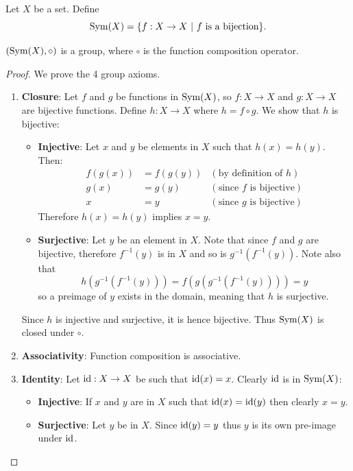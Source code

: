 \begin{definition}
    Let $X$ be a set. Define
    \[
        \mathrm{Sym}(X) = \{f: X \to X \ | \ f \text{ is a bijection}\}.
    \]
\end{definition}
\begin{proposition}
    $(\mathrm{Sym}(X), \circ)$ is a group, where $\circ$ is the function composition operator.
\end{proposition}
\begin{proof}
    We prove the 4 group axioms.
    \begin{enumerate}
        \item \textbf{Closure}: Let $f$ and $g$ be functions in $\mathrm{Sym}(X)$, so $f: X\to X$ and $g:X \to X$ are bijective functions. Define $h:X \to X$ where $h = f\circ g$. We show that $h$ is bijective:
        \begin{itemize}
            \item \textbf{Injective}: Let $x$ and $y$ be elements in $X$ such that $h(x) = h(y)$. Then:
            \begin{align*}
                f(g(x)) &= f(g(y)) & (\text{by definition of } h)\\
                g(x) &= g(y) & (\text{since } f \text{ is bijective})\\
                x &= y & (\text{since } g \text{ is bijective})
            \end{align*}
            Therefore $h(x) = h(y)$ implies $x = y$.
            \item \textbf{Surjective}: Let $y$ be an element in $X$. Note that since $f$ and $g$ are bijective, therefore $f^{-1}(y)$ is in $X$ and so is $g^{-1}(f^{-1}(y))$. Note also that
            \[
                h(g^{-1}(f^{-1}(y))) = f(g(g^{-1}(f^{-1}(y)))) = y
            \]
            so a preimage of $y$ exists in the domain, meaning that $h$ is surjective.
        \end{itemize}
        Since $h$ is injective and surjective, it is hence bijective. Thus $\mathrm{Sym}(X)$ is closed under $\circ$.
        \item \textbf{Associativity}: Function composition is associative.
        \item \textbf{Identity}: Let $\mathrm{id} : X \to X$ be such that $\mathrm{id}(x) = x$. Clearly $\mathrm{id}$ is in $\mathrm{Sym}(X)$:
        \begin{itemize}
            \item \textbf{Injective}: If $x$ and $y$ are in $X$ such that $\mathrm{id}(x) = \mathrm{id}(y)$ then clearly $x = y$.
            \item \textbf{Surjective}: Let $y$ be in $X$. Since $\mathrm{id}(y) = y$ thus $y$ is its own pre-image under $\mathrm{id}$.

\end{itemize}
\end{enumerate}
\end{proof}
